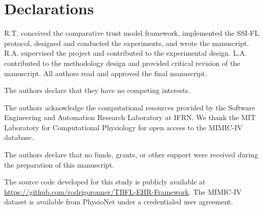 \documentclass{sbc2023}
\begin{document}
\section*{Declarations}

\begin{contributions}
R.T. conceived the comparative trust model framework, implemented the SSI-FL protocol, designed and conducted the experiments, and wrote the manuscript. R.A. supervised the project and contributed to the experimental design. L.A. contributed to the methodology design and provided critical revision of the manuscript. All authors read and approved the final manuscript.
\end{contributions}

\begin{interests}
The authors declare that they have no competing interests.
\end{interests}

\begin{acknowledgements}
The authors acknowledge the computational resources provided by the Software Engineering and Automation Research Laboratory at IFRN. We thank the MIT Laboratory for Computational Physiology for open access to the MIMIC-IV database.
\end{acknowledgements}

\begin{funding}
The authors declare that no funds, grants, or other support were received during the preparation of this manuscript.
\end{funding}

\begin{materials}
The source code developed for this study is publicly available at \url{https://github.com/rodrigoronner/TBFL-EHR-Framework}. The MIMIC-IV dataset is available from PhysioNet under a credentialed user agreement.
\end{materials}



\end{document}

